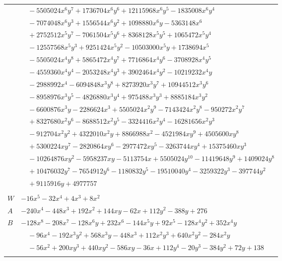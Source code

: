 \documentclass[11pt]{article}
\begin{document}
\begin{longtable}{@{}ll@{}}
 & $\quad -5505024x^{6}y^{7}+1736704x^{6}y^{6}+12115968x^{6}y^{5}-1835008x^{6}y^{4}$\\
 & $\quad -7074048x^{6}y^{3}+1556544x^{6}y^{2}+1098880x^{6}y-5363148x^{6}$\\
 & $\quad +2752512x^{5}y^{7}-7061504x^{5}y^{6}+8368128x^{5}y^{5}+1065472x^{5}y^{4}$\\
 & $\quad -12557568x^{5}y^{3}+9251424x^{5}y^{2}-10503000x^{5}y+1738694x^{5}$\\
 & $\quad -5505024x^{4}y^{8}+5865472x^{4}y^{7}+7716864x^{4}y^{6}-3708928x^{4}y^{5}$\\
 & $\quad -4559360x^{4}y^{4}-2053248x^{4}y^{3}+3902464x^{4}y^{2}-10219232x^{4}y$\\
 & $\quad -2988992x^{4}-6094848x^{3}y^{8}+8273920x^{3}y^{7}+10944512x^{3}y^{6}$\\
 & $\quad -8958976x^{3}y^{5}-4826880x^{3}y^{4}+975488x^{3}y^{3}+8885184x^{3}y^{2}$\\
 & $\quad -6600876x^{3}y-2286624x^{3}+5505024x^{2}y^{9}-7143424x^{2}y^{8}-950272x^{2}y^{7}$\\
 & $\quad +8327680x^{2}y^{6}-8688512x^{2}y^{5}-3324416x^{2}y^{4}-16281656x^{2}y^{3}$\\
 & $\quad -912704x^{2}y^{2}+4322010x^{2}y+8866988x^{2}-4521984xy^{9}+4505600xy^{8}$\\
 & $\quad +5300224xy^{7}-2820864xy^{6}-2977472xy^{5}-3263744xy^{4}+15375460xy^{3}$\\
 & $\quad -10264876xy^{2}-5958237xy-5113754x+5505024y^{10}-11419648y^{9}+1409024y^{8}$\\
 & $\quad +10476032y^{7}-7654912y^{6}-1180832y^{5}-19510040y^{4}-3259322y^{3}-397744y^{2}$\\
 & $\quad +9115916y+4977757$\\
\addlinespace[3pt]
\multicolumn{2}{@{}l}{$i=41$, $m=4$, neighbours $45,14,17,23,33$}\\
$W$ & $-16x^{5}-32x^{4}+4x^{3}+8x^{2}$\\
$A$ & $-240x^{4}-448x^{3}+192x^{2}+144xy-62x+112y^{2}-388y+276$\\
$B$ & $-128x^{8}-208x^{7}-128x^{6}y+232x^{6}-144x^{5}y+92x^{5}-128x^{4}y^{2}+352x^{4}y$\\
 & $\quad -96x^{4}-192x^{3}y^{2}+568x^{3}y-448x^{3}+112x^{2}y^{3}+640x^{2}y^{2}-284x^{2}y$\\
 & $\quad -56x^{2}+200xy^{3}+440xy^{2}-586xy-36x+112y^{4}-20y^{3}-384y^{2}+72y+138$\\
\addlinespace[3pt]
\end{longtable}
\endgroup
\end{document}
